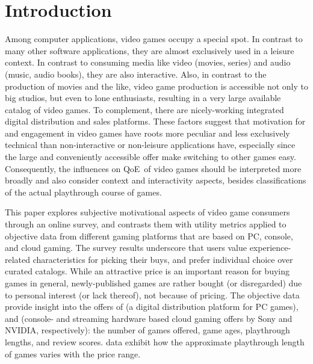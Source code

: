 
\section{Introduction}

Among computer applications, video games occupy a special spot.
In contrast to many other software applications, they are almost
exclusively used in a leisure context.
In contrast to consuming media like video (movies, series) and
audio (music, audio books), they are also interactive.
Also, in contrast to the production of movies and the like, video game
production is accessible not only to big studios, but even to lone
enthusiasts, resulting in a very large available catalog of video games.
To complement, there are nicely-working integrated digital distribution
and sales platforms.
These factors suggest that motivation for and engagement in video games
have roots more peculiar and less exclusively technical than
non-interactive or non-leisure applications have, especially since
the large and conveniently accessible offer make switching to other
games easy.
Consequently, the influences on \gls{QoE} of video games should be
interpreted more broadly and also consider context and interactivity
aspects, besides classifications of the actual playthrough course of
games.

This paper explores subjective motivational aspects of video game
consumers through an online survey, and contrasts them with utility
metrics applied to objective data from different gaming platforms
that are based on PC, console, and cloud gaming.
The survey results underscore that users value experience-related
characteristics for picking their buys, and prefer individual choice
over curated catalogs. While an attractive price is an important
reason for buying games in general, newly-published games are rather
bought (or disregarded) due to personal interest (or lack thereof),
not because of pricing.
The objective data provide insight into the offers of \steam
(a digital distribution platform for PC games), \psnow and \gfnow
(console- and streaming hardware based cloud gaming offers by Sony
and NVIDIA, respectively): the number
of games offered, game ages, playthrough lengths, and review scores.
\steam data exhibit how the approximate playthrough length of games
varies with the price range.
